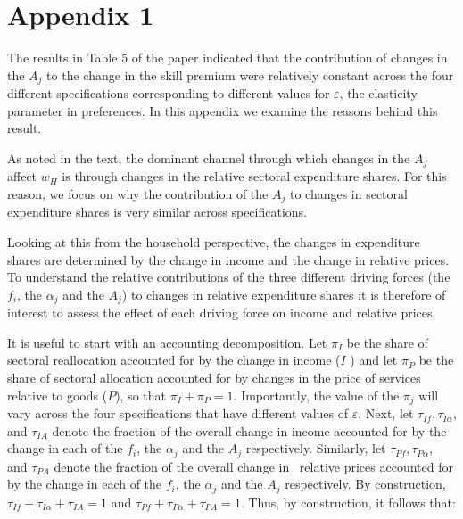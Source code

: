 \documentclass[12pt,english]{article}
\begin{document}
{\normalsize \bigskip }

{\normalsize \newpage }

{\normalsize 


}

\newpage
\appendix
\section*{Appendix 1}
The results in Table 5 of the paper indicated that the contribution of
changes in the $A_{j}$ to the change in the skill premium were relatively
constant across the four different specifications corresponding to different
values for $\varepsilon $, the elasticity parameter in preferences. In this
appendix we examine the reasons behind this result.

As noted in the text, the dominant channel through which changes in the $%
A_{j}$ affect $w_{H}$ is through changes in the relative sectoral
expenditure shares. For this reason, we focus on why the contribution of the 
$A_{j}$ to changes in sectoral expenditure shares is very similar across
specifications.

Looking at this from the household perspective, the changes in expenditure
shares are determined by the change in income and the change in relative
prices. To understand the relative contributions of the three different
driving forces (the $f_{i}$, the $\alpha _{j}$ and the $A_{j}$) to changes
in relative expenditure shares it is therefore of interest to assess the
effect of each driving force on income and relative prices.

It is useful to start with an accounting decomposition. Let $\pi _{I}$ be
the share of sectoral reallocation accounted for by the change in income ($I$%
) and let $\pi _{P}$ be the share of sectoral allocation accounted for by
changes in the price of services relative to goods ($P$), so that $\pi
_{I}+\pi _{P}=1$. Importantly, the value of the $\pi _{j}$ will vary across
the four specifications that have different values of $\varepsilon $. Next,
let $\tau _{If},\tau _{I\alpha }$, and $\tau _{IA}$ denote the fraction of
the overall change in income accounted for by the change in each of the $%
f_{i}$, the $\alpha _{j}$ and the $A_{j}$ respectively. Similarly, let $\tau
_{Pf},\tau _{P\alpha }$, and $\tau _{PA}$ denote the fraction of the overall
change in \ relative prices accounted for by the change in each of the $f_{i}
$, the $\alpha _{j}$ and the $A_{j}$ respectively. By construction, $\tau
_{If}+\tau _{I\alpha }+\tau _{IA}=1$ and $\tau
_{Pf}+\tau _{P\alpha }+\tau _{PA}=1$. Thus, by
construction, it follows that:
\end{document}
